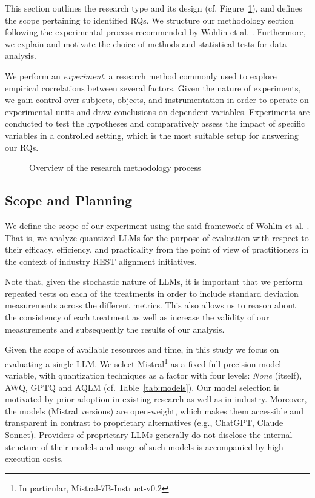\documentclass[conference]{IEEEtran}
\begin{document}
This section outlines the research type and its design (cf. Figure~\ref{fig:method-overview}), and defines the scope pertaining to identified RQs. We structure our methodology section following the experimental process recommended by Wohlin et al. \cite{wohlin2012experimentation}. Furthermore, we explain and motivate the choice of methods and statistical tests for data analysis. 

We perform an \textit{experiment}, a research method commonly used to explore empirical correlations between several factors. Given the nature of experiments, we gain control over subjects, objects, and instrumentation in order to operate on experimental units and draw conclusions on dependent variables. Experiments are conducted to test the hypotheses and comparatively assess the impact of specific variables in a controlled setting, which is the most suitable setup for answering our RQs.

\begin{figure}[h]
    \centering
    
    \caption{Overview of the research methodology process}
    \label{fig:method-overview}
\end{figure}

\subsection{Scope and Planning}

We define the scope of our experiment using the said framework of Wohlin et al. \cite{wohlin2012experimentation}. That is, we analyze quantized LLMs for the purpose of evaluation with respect to their efficacy, efficiency, and practicality from the point of view of practitioners in the context of industry REST alignment initiatives.

Note that, given the stochastic nature of LLMs, it is important that we perform repeated tests on each of the treatments in order to include standard deviation measurements across the different metrics. This also allows us to reason about the consistency of each treatment as well as increase the validity of our measurements and subsequently the results of our analysis.

Given the scope of available resources and time, in this study we focus on evaluating a single LLM. We select Mistral\footnote{In particular, Mistral-7B-Instruct-v0.2} as a fixed full-precision model variable, with quantization techniques as a factor with four levels: \textit{None} (itself), AWQ, GPTQ and AQLM (cf. Table~\ref{tab:models}). Our model selection is motivated by prior adoption in existing research as well as in industry. Moreover, the models (Mistral versions) are open-weight, which makes them accessible and transparent in contrast to proprietary alternatives (e.g., ChatGPT, Claude Sonnet). Providers of proprietary LLMs generally do not disclose the internal structure of their models and usage of such models is accompanied by high execution costs.
\end{document}
